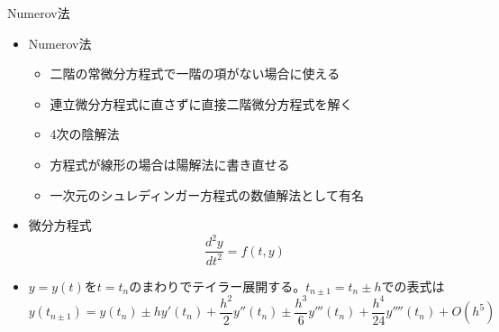 \begin{frame}[t,fragile]{Numerov法}
  \begin{itemize}
  \item Numerov法
    \begin{itemize}
    \item 二階の常微分方程式で一階の項がない場合に使える
    \item 連立微分方程式に直さずに直接二階微分方程式を解く
    \item 4次の陰解法
    \item 方程式が線形の場合は陽解法に書き直せる
    \item 一次元のシュレディンガー方程式の数値解法として有名
    \end{itemize}
  \item 微分方程式
    \[
    \frac{d^2y}{dt^2} = f(t,y)
    \]
  \item $y=y(t)$を$t=t_n$のまわりでテイラー展開する。$t_{n \pm 1} = t_n \pm h$での表式は
      \[
      y(t_{n \pm 1}) = y(t_n) \pm h y'(t_n) + \frac{h^2}{2} y''(t_n) \pm \frac{h^3}{6} y'''(t_n) + \frac{h^4}{24} y''''(t_n)  + O(h^5)
      \]
  \end{itemize}
\end{frame}
